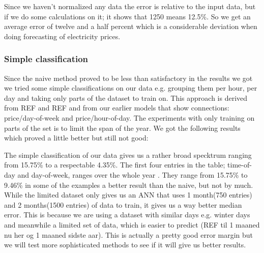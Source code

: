 Since we haven't normalized any data the error is relative to the input data, but if we do some calculations on it; it shows that 1250 means 12.5\%. So we get an average error of twelve and a half percent which is a considerable deviation when doing forecasting of electricity prices. 
\subsubsection{Simple classification}
Since the naive method proved to be less than satisfactory in the results we got we tried some simple classifications on our data e.g. grouping them per hour, per day and taking only parts of the dataset to train on. This approach is derived from REF and REF and from our earlier models that show connections: price/day-of-week and price/hour-of-day. The experiments with only training on parts of the set is to limit the span of the year. We got the following results which proved a little better but still not good:

\begin{table}[!ht]
\centering  %
\caption{Results from the simple classification approach} %
\label{table:naiveTrainingApproach} %
\end{table}

The simple classification of our data gives us a rather broad specktrum ranging from 15.75\% to a respectable 4.35\%. The first four entries in the table; time-of-day and day-of-week, ranges over the whole year . They range from 15.75\% to 9.46\% in some of the examples a better result than the naive, but not by much. While the limited dataset only gives us an ANN that uses 1 month(750 entries) and 2 months(1500 entries) of data to train, it gives us a way better median error. This is because we are using a dataset with similar days e.g. winter days and meanwhile a limited set of data, which is easier to predict (REF til 1 maaned nu her og 1 maaned sidste aar). This is actually a pretty good error margin but we will test more sophisticated methods to see if it will give us better results. 

